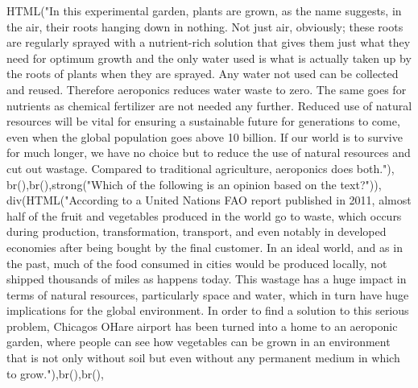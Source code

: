 \documentclass[
]{article}
\newenvironment{Shaded}{\begin{snugshade}}{\end{snugshade}}
\newcommand{\FunctionTok}[1]{\textcolor[rgb]{0.00,0.00,0.00}{#1}}
\newcommand{\NormalTok}[1]{#1}
\newcommand{\StringTok}[1]{\textcolor[rgb]{0.31,0.60,0.02}{#1}}
\begin{document}
\begin{Shaded}
\begin{Highlighting}[]
               \FunctionTok{HTML}\NormalTok{(}\StringTok{"In this experimental garden, plants are grown, as the name suggests, in the air, their roots hanging down in nothing. Not just air, obviously; these roots are regularly sprayed with a nutrient{-}rich solution that gives them just what they need for optimum growth and the only water used is what is actually taken up by the roots of plants when they are sprayed. Any water not used can be collected and reused. Therefore aeroponics reduces water waste to zero. The same goes for nutrients as chemical fertilizer are not needed any further. Reduced use of natural resources will be vital for ensuring a sustainable future for generations to come, even when the global population goes above 10 billion. If our world is to survive for much longer, we have no choice but to reduce the use of natural resources and cut out wastage.  Compared to traditional agriculture, aeroponics does both."}\NormalTok{), }\FunctionTok{br}\NormalTok{(),}\FunctionTok{br}\NormalTok{(),}\FunctionTok{strong}\NormalTok{(}\StringTok{"Which of the following is an opinion based on the text?"}\NormalTok{)),}
           \FunctionTok{div}\NormalTok{(}\FunctionTok{HTML}\NormalTok{(}\StringTok{"According to a United Nations FAO report published in 2011, almost half of the fruit and vegetables produced in the world go to waste, which occurs during production, transformation, transport, and even  notably in developed economies  after being bought by the final customer. In an ideal world, and as in the past, much of the food consumed in cities would be produced locally, not shipped thousands of miles as happens today. This wastage has a huge impact in terms of natural resources, particularly space and water, which in turn have huge implications for the global environment. In order to find a solution to this serious problem, Chicago\textquotesingle{}s O\textquotesingle{}Hare airport has been turned into a home to an aeroponic garden, where people can see how vegetables can be grown in an environment that is not only without soil but even without any permanent medium in which to grow."}\NormalTok{),}\FunctionTok{br}\NormalTok{(),}\FunctionTok{br}\NormalTok{(), }

\end{Highlighting}
\end{Shaded}
\end{document}
